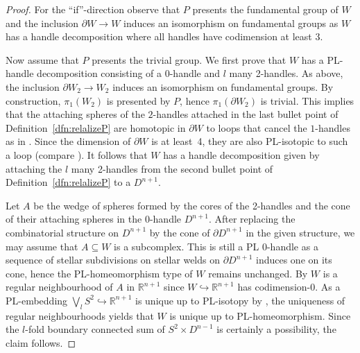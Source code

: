 \documentclass[a4paper, reqno]{amsart}
\theoremstyle{definition}
\theoremstyle{remark}
\newcommand{\R}{\mathbb{R}}
\renewcommand{\~}{\nobreak\ }
\begin{document}
\begin{proof}
    For the \enquote{if}-direction observe that $P$ presents the fundamental group of $W$ and the inclusion $\partial W\to W$ induces an isomorphism on fundamental groups as $W$ has a handle decomposition where all handles have codimension at least 3.

    Now assume that $P$ presents the trivial group. We first prove that $W$ has a PL-handle decomposition consisting of a 0-handle and $l$ many 2-handles. As above, the inclusion $\partial W_2\to W_2$ induces an isomorphism on fundamental groups. By construction, $\pi_1(W_2)$ is presented by $P$, hence $\pi_1(\partial W_2)$ is trivial. This implies that the attaching spheres of the $2$-handles attached in the last bullet point of Definition~\ref {dfn:relalizeP} are homotopic in $\partial W$ to loops that cancel the $1$-handles as in \cite[Lemma 6.4]{rourkesandersonnew}. Since the dimension of $\partial W$ is at least\~4, they are also PL-isotopic to such a loop (compare \cite[Corollary 5.9]{rourkesandersonnew}). It follows that $W$ has a handle decomposition given by attaching the $l$ many 2-handles from the second bullet point of Definition~\ref {dfn:relalizeP} to a $D^{n+1}$.

    Let $A$ be the wedge of spheres formed by the cores of the 2-handles and the cone of their attaching spheres in the 0-handle $D^{n+1}$. After replacing the combinatorial structure on $D^{n+1}$ by the cone of $\partial D^{n+1}$ in the given structure, we may assume that $A\subseteq W$ is a subcomplex. This is still a PL 0-handle as a sequence of stellar subdivisions on stellar welds on $\partial D^{n+1}$ induces one on its cone, hence the PL-homeomorphism type of $W$ remains unchanged. By \cite[Corollary\~3.30]{rourkesandersonnew} $W$ is a regular neighbourhood of $A$ in $\R^{n+1}$ since $W\hookrightarrow\R^{n+1}$ has \mbox{codimension-0}. As a PL-embedding $\bigvee_l S^2\hookrightarrow \R^{n+1}$ is unique up to PL-isotopy by \cite[Theorem\~1]{Husch}, the uniqueness of regular neighbourhoods \cite[Theorem\~3.8]{rourkesandersonnew} yields that $W$ is unique up to PL-homeomorphism. Since the $l$-fold boundary connected sum of $S^2\times D^{n-1}$ is certainly a possibility, the claim follows. 
\end{proof}


\end{document}
